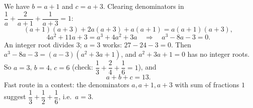 We have $b=a+1$ and $c=a+3$. Clearing denominators in $\dfrac{1}{a}+\dfrac{2}{a+1}+\dfrac{1}{a+3}=1$:
\[(a+1)(a+3)+2a(a+3)+a(a+1)=a(a+1)(a+3),\]
\[4a^2+11a+3=a^3+4a^2+3a\quad\Longrightarrow\quad a^3-8a-3=0 .\]
An integer root divides $3$; $a=3$ works: $27-24-3=0$. Then $a^3-8a-3=(a-3)(a^2+3a+1)$, and $a^2+3a+1=0$ has no integer roots. So $a=3$, $b=4$, $c=6$ (check: $\dfrac{1}{3}+\dfrac{2}{4}+\dfrac{1}{6}=1$), and
\[a+b+c=\boxed{13}.\]
Fast route in a contest: the denominators $a,a+1,a+3$ with sum of fractions $1$ suggest $\dfrac{1}{3}+\dfrac{1}{2}+\dfrac{1}{6}$, i.e.\ $a=3$.
